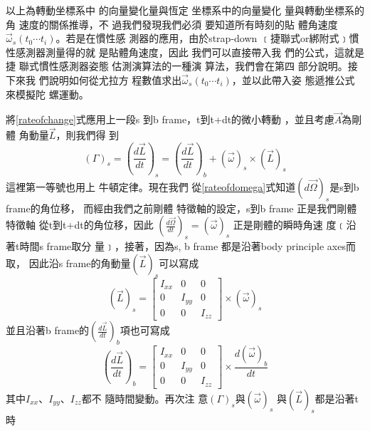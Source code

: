 \documentclass[12pt,twoside]{article}
\begin{document}
以上為轉動坐標系中%
的向量變化量與恆定%
坐標系中的向量變化%
量與轉動坐標系的角%
速度的關係推導，不%
過我們發現我們必須%
要知道所有時刻的貼%
體角速度$\vec{\omega}_{s}\left( t_{0}\cdots
t_{i}\right) $。若是在慣性感%
測器的應用，由於strap-down%
﹝捷聯式or綁附式﹞慣%
性感測器測量得的就%
是貼體角速度，因此%
我們可以直接帶入我%
們的公式，這就是捷%
聯式慣性感測器姿態%
估測演算法的一種演%
算法，我們會在第四%
部分說明。接下來我%
們說明如何從尤拉方%
程數值求出$\vec{\omega}_{s}\left( t_{0}\cdots
t_{i}\right) $，並以此帶入姿%
態遞推公式來模擬陀%
螺運動。

將\ref{rateofchange}式應用上一段s%
到b frame，t到t+dt的微小轉動%
，並且考慮$\vec{A}$為剛體%
角動量$\vec{L}$，則我們得%
到%
\begin{equation}
\left( \Gamma \right) _{s}=\left( \frac{d\vec{L}}{dt}\right) _{s}=\left( 
\frac{d\vec{L}}{dt}\right) _{b}+\left( \vec{\omega}\right) _{s}\times \left( 
\vec{L}\right) _{s}  \label{liw}
\end{equation}%
這裡第一等號也用上%
牛頓定律。現在我們%
從\ref{rateofdomega}式知道$\left( d\vec{\Omega}%
\right) _{s}$是s到b frame的角位移，%
而經由我們之前剛體%
特徵軸的設定，s到b frame%
正是我們剛體特徵軸%
從t到t+dt的角位移，因此%
$\left( \frac{d\vec{\Omega}}{dt}\right) _{s}=\left( \vec{\omega}\right) _{s}$%
正是剛體的瞬時角速%
度﹝沿著t時間s frame取分%
量﹞，接著，因為s, b frame%
都是沿著body principle axes而取，%
因此沿s frame的角動量$\left( \vec{L%
}\right) _{s}$可以寫成%
\begin{equation*}
\left( \vec{L}\right) _{s}=\left[ 
\begin{array}{ccc}
I_{xx} & 0 & 0 \\ 
0 & I_{yy} & 0 \\ 
0 & 0 & I_{zz}%
\end{array}%
\right] \times \left( \vec{\omega}\right) _{s}
\end{equation*}%
並且沿著b frame的$\left( \frac{d\vec{L}}{dt}%
\right) _{b}$項也可寫成%
\begin{equation*}
\left( \frac{d\vec{L}}{dt}\right) _{b}=\left[ 
\begin{array}{ccc}
I_{xx} & 0 & 0 \\ 
0 & I_{yy} & 0 \\ 
0 & 0 & I_{zz}%
\end{array}%
\right] \times \frac{d\left( \vec{\omega}\right) _{b}}{dt}
\end{equation*}%
其中$I_{xx}$、$I_{yy}$、$I_{zz}$都不%
隨時間變動。再次注%
意$\left( \Gamma \right) _{s}$與$\left( \vec{\omega}\right) _{s}$%
與$\left( \vec{L}\right) _{s}$都是沿著t時%
\end{document}
